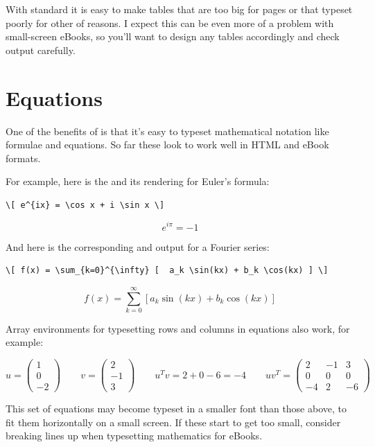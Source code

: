 With standard \latex it is easy to make tables that are too big for pages or that typeset poorly for other of reasons.
I expect this can be even more of a problem with small-screen eBooks, so you'll want to design any tables accordingly
and check output carefully.

\section{Equations}

One of the benefits of \latex is that it's easy to typeset mathematical notation like formulae and equations. So far these look to work well in HTML and eBook formats.

For example, here is the \tex and its rendering for Euler's formula:

\begin{Verbatim}[fontsize=\scriptsize]
\[ e^{ix} = \cos x + i \sin x \]
\end{Verbatim}
\[ e^{i\pi} = -1 \]

And here is the corresponding \tex and output for a Fourier series:

\begin{Verbatim}[fontsize=\scriptsize]
\[ f(x) = \sum_{k=0}^{\infty} [  a_k \sin(kx) + b_k \cos(kx) ] \]
\end{Verbatim}
\[ f(x) = \sum_{k=0}^{\infty} [  a_k \sin(kx) + b_k \cos(kx) ] \]

Array environments for typesetting rows and columns in equations also work, for example:

\[
u = \left( \begin{array}{c} 1 \\ 0 \\ -2 \end{array} \right) \qquad
v = \left( \begin{array}{c} 2 \\ -1 \\ 3 \end{array} \right) \qquad
u^T v = 2 + 0 - 6 = -4 \qquad
u v^T = \left( \begin{array}{ccc} 2 & -1 & 3 \\ 0 & 0 & 0 \\ -4 & 2 & -6 \end{array} \right)
\]

This set of equations may become typeset in a smaller font than those above, to fit them
horizontally on a small screen. If these start to get too small, consider breaking lines up
when typesetting mathematics for eBooks.

